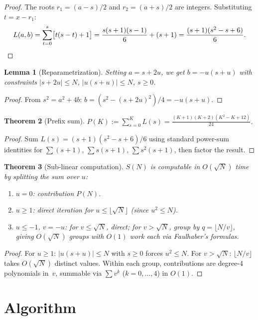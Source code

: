 \documentclass[11pt,a4paper]{article}
\newtheorem{theorem}{Theorem}
\newtheorem{lemma}[theorem]{Lemma}
\begin{document}
\begin{proof}
The roots $r_1 = (a-s)/2$ and $r_2 = (a+s)/2$ are integers.  Substituting $t = x - r_1$:
\[
L(a,b) = \sum_{t=0}^{s}\bigl[t(s-t)+1\bigr] = \frac{s(s+1)(s-1)}{6} + (s+1) = \frac{(s+1)(s^2-s+6)}{6}. \qedhere
\]
\end{proof}

\begin{lemma}[Reparametrization]
Setting $a = s + 2u$, we get $b = -u(s+u)$ with constraints $|s+2u| \le N$, $|u(s+u)| \le N$, $s \ge 0$.
\end{lemma}

\begin{proof}
From $s^2 = a^2 + 4b$: $b = (s^2-(s+2u)^2)/4 = -u(s+u)$.
\end{proof}

\begin{theorem}[Prefix sum]
\label{thm:prefix}
$P(K) := \sum_{s=0}^{K} L(s) = \frac{(K+1)(K+2)(K^2 - K + 12)}{24}$.
\end{theorem}

\begin{proof}
Sum $L(s) = (s+1)(s^2-s+6)/6$ using standard power-sum identities for $\sum(s+1)$, $\sum s(s+1)$, $\sum s^2(s+1)$, then factor the result.
\end{proof}

\begin{theorem}[Sub-linear computation]
$S(N)$ is computable in $O(\sqrt{N})$ time by splitting the sum over $u$:
\begin{enumerate}
  \item $u=0$: contribution $P(N)$.
  \item $u \ge 1$: direct iteration for $u \le \lfloor\sqrt{N}\rfloor$ (since $u^2 \le N$).
  \item $u \le -1$, $v=-u$: for $v \le \sqrt{N}$, direct; for $v > \sqrt{N}$, group by $q = \lfloor N/v \rfloor$, giving $O(\sqrt{N})$ groups with $O(1)$ work each via Faulhaber's formulas.
\end{enumerate}
\end{theorem}

\begin{proof}
For $u \ge 1$: $|u(s+u)| \le N$ with $s \ge 0$ forces $u^2 \le N$.  For $v > \sqrt{N}$: $\lfloor N/v\rfloor$ takes $O(\sqrt{N})$ distinct values.  Within each group, contributions are degree-4 polynomials in~$v$, summable via $\sum v^k$ ($k = 0,\ldots,4$) in $O(1)$.
\end{proof}

\section{Algorithm}
\end{document}
